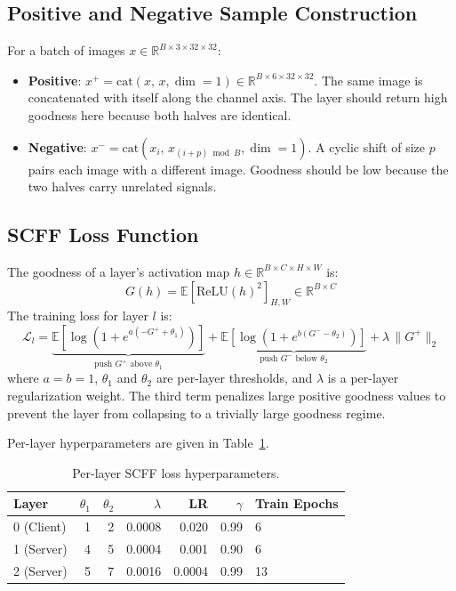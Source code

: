 \documentclass[12pt]{article}
\begin{document}
\subsection{Positive and Negative Sample Construction}

For a batch of images $x \in \mathbb{R}^{B \times 3 \times 32 \times 32}$:
\begin{itemize}
  \item \textbf{Positive}: $x^+ = \text{cat}(x,\, x, \dim=1) \in
        \mathbb{R}^{B \times 6 \times 32 \times 32}$. The same image is concatenated with
        itself along the channel axis. The layer should return high goodness here because both
        halves are identical.
  \item \textbf{Negative}: $x^- = \text{cat}(x_i,\, x_{(i+p) \bmod B}, \dim=1)$. A cyclic
        shift of size $p$ pairs each image with a different image. Goodness should be low
        because the two halves carry unrelated signals.
\end{itemize}

\subsection{SCFF Loss Function}

The goodness of a layer's activation map $h \in \mathbb{R}^{B \times C \times H \times W}$ is:
\begin{equation}
  G(h) = \mathbb{E}\!\left[\text{ReLU}(h)^2\right]_{H,W} \in \mathbb{R}^{B \times C}
\end{equation}
The training loss for layer $l$ is:
\begin{equation}
  \mathcal{L}_l =
  \underbrace{\mathbb{E}\!\left[\log\!\left(1 + e^{a(-G^+ + \theta_1)}\right)\right]}_{\text{push } G^+ \text{ above } \theta_1}
  + \underbrace{\mathbb{E}\!\left[\log\!\left(1 + e^{b(G^- - \theta_2)}\right)\right]}_{\text{push } G^- \text{ below } \theta_2}
  + \lambda\,\|G^+\|_2
  \label{eq:scff_loss}
\end{equation}
where $a = b = 1$, $\theta_1$ and $\theta_2$ are per-layer thresholds, and $\lambda$ is a
per-layer regularization weight. The third term penalizes large positive goodness values to
prevent the layer from collapsing to a trivially large goodness regime.

Per-layer hyperparameters are given in Table~\ref{tab:hyperparams}.

\begin{table}[htbp]
  \centering
  \caption{Per-layer SCFF loss hyperparameters.}
  \label{tab:hyperparams}
  \begin{tabular}{lrrrrrl}
    \toprule
    Layer & $\theta_1$ & $\theta_2$ & $\lambda$ & LR & $\gamma$ & Train Epochs \\
    \midrule
    0 (Client) & 1 & 2 & 0.0008 & 0.020  & 0.99 & 6  \\
    1 (Server) & 4 & 5 & 0.0004 & 0.001  & 0.90 & 6  \\
    2 (Server) & 5 & 7 & 0.0016 & 0.0004 & 0.99 & 13 \\
    \bottomrule
  \end{tabular}
\end{table}
\end{document}
